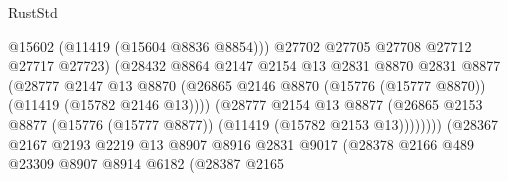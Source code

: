 \begin{lexlean}{RustStd}
\begin{coremodule}
                                            @15602
                                            (@11419 (@15604 @8836 @8854)))
                                          @27702
                                          @27705
                                          @27708
                                          @27712
                                          @27717
                                          @27723)
                                        (@28432
                                          @8864
                                          @2147
                                          @2154
                                          @13
                                          @2831
                                          @8870
                                          @2831
                                          @8877
                                          (@28777
                                            @2147
                                            @13
                                            @8870
                                            (@26865
                                              @2146
                                              @8870
                                              (@15776 (@15777 @8870))
                                              (@11419 (@15782 @2146 @13))))
                                          (@28777
                                            @2154
                                            @13
                                            @8877
                                            (@26865
                                              @2153
                                              @8877
                                              (@15776 (@15777 @8877))
                                              (@11419 (@15782 @2153 @13))))))))
                                  (@28367
                                    @2167
                                    @2193
                                    @2219
                                    @13
                                    @8907
                                    @8916
                                    @2831
                                    @9017
                                    (@28378
                                      @2166
                                      @489
                                      @23309
                                      @8907
                                      @8914
                                      @6182
                                      (@28387
                                        @2165

\end{coremodule}
\end{lexlean}
